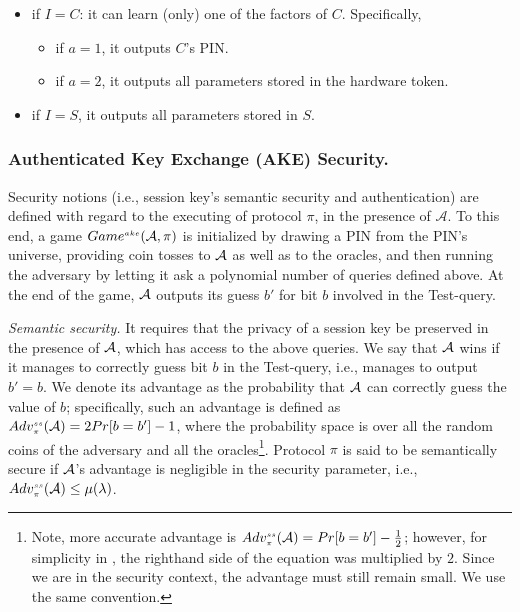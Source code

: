\begin{itemize}
\begin{itemize}

\item if $I=C$:  it can learn (only) one of the factors of $C$. Specifically, 
%



\begin{itemize}
\item if $a=1$, it outputs $C$'s PIN. 



\item if  $a=2$, it outputs all parameters stored in the hardware token. 
  \end{itemize}
  
  
  
\item if $I=S$, it outputs all parameters stored in $S$. 
\end{itemize}
\end{itemize}


 \vspace{-5mm}
\subsubsection{Authenticated Key Exchange (AKE)  Security.} Security notions (i.e., session key's semantic security and authentication) are defined with regard to the executing of protocol $\pi$, in the presence of   $\mathcal{A}$. To this end, a game $Game^{\scriptscriptstyle ake} (\mathcal{A},\pi)$ is initialized by drawing a PIN  from the PIN's universe,
providing coin tosses to $\mathcal{A}$ as well as to the oracles, and then running the adversary by letting it ask a polynomial
number of queries defined above. At the end of the game, $\mathcal{A}$  outputs its guess $b'$ for  bit $b$
involved in the Test-query. 



\noindent\textit{Semantic security.} It requires that the privacy of a session key be preserved in the presence of $\mathcal{A}$, which has access to the above queries. We say that $\mathcal{A}$  wins if it manages to correctly guess bit $b$ in the Test-query, i.e., manages to output $b'=b$. We denote its advantage as the probability that $\mathcal{A}$  can correctly guess the value of $b$; specifically, such an advantage is defined as $Adv_{\scriptscriptstyle\pi}^{\scriptscriptstyle ss}(\mathcal{A})=2Pr[b=b']-1$, where the probability space is over all the random coins of the adversary and all the oracles\footnote{Note, more accurate advantage is $Adv_{\scriptscriptstyle\pi}^{\scriptscriptstyle ss}(\mathcal{A})=Pr[b=b']-\frac{1}{2}$; however,  for simplicity in \cite{BellarePR00}, the righthand side of the equation was multiplied by $2$. Since we are in the security context, the advantage must still remain small. We use the same convention.}.  Protocol $\pi$ is said to be semantically secure if $\mathcal{A}$'s advantage is negligible in the security parameter, i.e., $Adv_{\scriptscriptstyle\pi}^{\scriptscriptstyle ss}(\mathcal{A})\leq \mu(\lambda)$.


